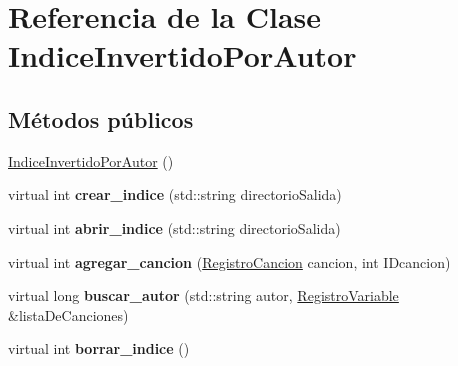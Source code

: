 \hypertarget{class_indice_invertido_por_autor}{\section{\-Referencia de la \-Clase \-Indice\-Invertido\-Por\-Autor}
\label{class_indice_invertido_por_autor}
}
\subsection*{\-Métodos públicos}
\begin{DoxyCompactItemize}
\item 
\hyperlink{class_indice_invertido_por_autor_a0593d122a05d2cf0848c7e5dce59cb29}{\-Indice\-Invertido\-Por\-Autor} ()
\item 
\hypertarget{class_indice_invertido_por_autor_a84a3dc0750bb23547f42b5bc9a47f3aa}{virtual int {\bfseries crear\-\_\-indice} (std\-::string directorio\-Salida)}\label{class_indice_invertido_por_autor_a84a3dc0750bb23547f42b5bc9a47f3aa}

\item 
\hypertarget{class_indice_invertido_por_autor_afc7b0a193a0271d0d34efdbf0ea821b0}{virtual int {\bfseries abrir\-\_\-indice} (std\-::string directorio\-Salida)}\label{class_indice_invertido_por_autor_afc7b0a193a0271d0d34efdbf0ea821b0}

\item 
\hypertarget{class_indice_invertido_por_autor_a719b703fd4d455be16a5c41ec3989fa8}{virtual int {\bfseries agregar\-\_\-cancion} (\hyperlink{class_registro_cancion}{\-Registro\-Cancion} cancion, int \-I\-Dcancion)}\label{class_indice_invertido_por_autor_a719b703fd4d455be16a5c41ec3989fa8}

\item 
\hypertarget{class_indice_invertido_por_autor_a3e02536870faeaa70e706fdf36c3c57b}{virtual long {\bfseries buscar\-\_\-autor} (std\-::string autor, \hyperlink{class_registro_variable}{\-Registro\-Variable} \&lista\-De\-Canciones)}\label{class_indice_invertido_por_autor_a3e02536870faeaa70e706fdf36c3c57b}

\item 
\hypertarget{class_indice_invertido_por_autor_a75bb1650ed6533cfd69f129045504d19}{virtual int {\bfseries borrar\-\_\-indice} ()}\label{class_indice_invertido_por_autor_a75bb1650ed6533cfd69f129045504d19}

\end{DoxyCompactItemize}


